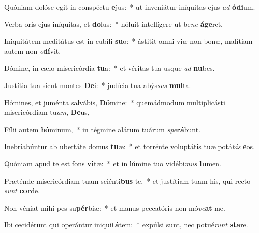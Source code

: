 \item Quóniam dolóse egit in conspéctu \textbf{e}jus:~* ut inveniátur iníquitas ejus \textit{ad} \textbf{ó}\textbf{di}um.
\item Verba oris ejus iníquitas, et \textbf{do}lus:~* nóluit intellígere ut be\textit{ne} \textbf{á}\textbf{ge}ret.
\item Iniquitátem meditátus est in cubíli \textbf{su}o:~* ástitit omni viæ non bonæ, malítiam autem non \textit{o}\textbf{dí}vit.
\item Dómine, in cælo misericórdia \textbf{tu}a:~* et véritas tua usque \textit{ad} \textbf{nu}bes.
\item Justítia tua sicut montes \textbf{De}i:~* judícia tua abýs\textit{sus} \textbf{mul}ta.
\item Hómines, et juménta salvábis, \textbf{Dó}mine:~* quemádmodum multiplicásti misericórdiam tu\textit{am}, \textbf{De}us,
\item Fílii autem \textbf{hó}minum,~* in tégmine alárum tuárum \textit{spe}\textbf{rá}bunt.
\item Inebriabúntur ab ubertáte domus \textbf{tu}æ:~* et torrénte voluptátis tuæ potá\textit{bis} \textbf{e}os.
\item Quóniam apud te est fons \textbf{vi}tæ:~* et in lúmine tuo vidébi\textit{mus} \textbf{lu}men.
\item Præténde misericórdiam tuam sciénti\textbf{bus} te,~* et justítiam tuam his, qui recto \textit{sunt} \textbf{cor}de.
\item Non véniat mihi pes su\textbf{pér}biæ:~* et manus peccatóris non mó\textit{ve}\textbf{at} me.
\item Ibi cecidérunt qui operántur iniqui\textbf{tá}tem:~* expúlsi sunt, nec potué\textit{runt} \textbf{sta}re.
